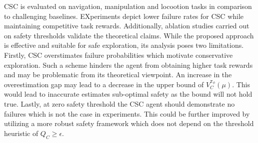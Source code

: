 \documentclass[11pt,letterpaper]{article}
\begin{document}
CSC is evaluated on navigation, manipulation and locootion tasks in comparison to challenging baselines. EXperiments depict lower failure rates for CSC while maintaining competitive task rewards. Additionally, ablation studies carried out on safety thresholds validate the theoretical claims. While the proposed approach is effective and suitable for safe exploration, its analysis poses two limitations. Firstly, CSC overstimates failure probabilities which motivate conservative exploration. Such a scheme hinders the agent from obtaining higher task rewards and may be problematic from its theoretical viewpoint. An increase in the overestimation gap may lead to a decrease in the upper bound of $V_{C}^{\pi_{\phi}}(\mu)$. This would lead to inaccurate estimates sub-optimal safety as the bound will not hold true. Lastly, at zero safety threshold the CSC agent should demonstrate no failures which is not the case in experiments. This could be further improved by utilizing a more robust safety framework which does not depend on the threshold heuristic of $Q_{C} \geq \epsilon$. 
\end{document}
